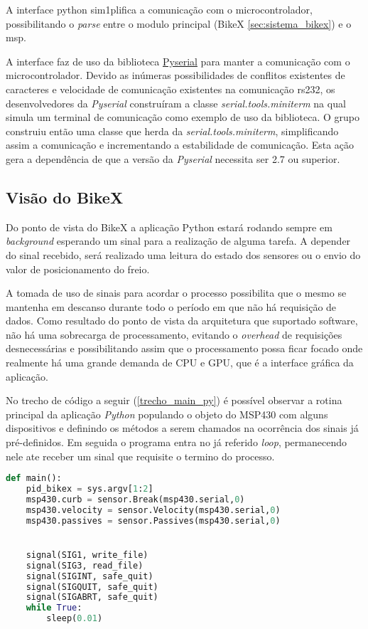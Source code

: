 A interface \gls{python} sim1plifica a comunicação com o microcontrolador, possibilitando o \textit{parse} entre o modulo principal (BikeX \ref{sec:sistema_bikex}) e o \gls{msp}.

A interface faz de uso da biblioteca \href{http://pyserial.sourceforge.net/pyserial.html}{Pyserial} para manter a comunicação com o microcontrolador. Devido as inúmeras possibilidades de conflitos existentes de caracteres e velocidade de comunicação existentes na comunicação \gls{rs232}, os desenvolvedores da \textit{Pyserial} construíram a classe \textit{serial.tools.miniterm} na qual simula um terminal de comunicação como exemplo de uso da biblioteca. O grupo construiu então uma classe que herda da \textit{serial.tools.miniterm}, simplificando assim a comunicação e incrementando a estabilidade de comunicação. Esta ação gera a dependência de que a versão da \textit{Pyserial} necessita ser 2.7 ou superior.

\subsection{Visão do BikeX} %
\label{sub:vis_o_do_bikex}

Do ponto de vista do BikeX a aplicação Python estará rodando sempre em \textit{background} esperando um sinal para a realização de alguma tarefa. A depender do sinal recebido, será realizado uma leitura do estado dos sensores ou o envio do valor de posicionamento do freio.

A tomada de uso de sinais para acordar o processo possibilita que o mesmo se mantenha em descanso durante todo o período em que não há requisição de dados. Como resultado do ponto de vista da arquitetura que suportado software, não há uma sobrecarga de processamento, evitando o \textit{overhead} de requisições desnecessárias e possibilitando assim que o processamento possa ficar focado onde realmente há uma grande demanda de CPU e GPU, que é a interface gráfica da aplicação.

No trecho de código a seguir (\ref{trecho_main_py}) é possível observar a rotina principal da aplicação \textit{Python} populando o objeto do MSP430 com alguns dispositivos e definindo os métodos a serem chamados na ocorrência dos sinais já pré-definidos. Em seguida o programa entra no já referido \textit{loop}, permanecendo nele ate receber um sinal que requisite o termino do processo.

\begin{lstlisting}[language=Python,caption={Trecho da rotina principal do script Python},label=trecho_main_py]
def main():
    pid_bikex = sys.argv[1:2]
    msp430.curb = sensor.Break(msp430.serial,0)
    msp430.velocity = sensor.Velocity(msp430.serial,0)
    msp430.passives = sensor.Passives(msp430.serial,0)


    signal(SIG1, write_file)
    signal(SIG3, read_file)
    signal(SIGINT, safe_quit)
    signal(SIGQUIT, safe_quit)
    signal(SIGABRT, safe_quit)
    while True:
        sleep(0.01)

\end{lstlisting}


